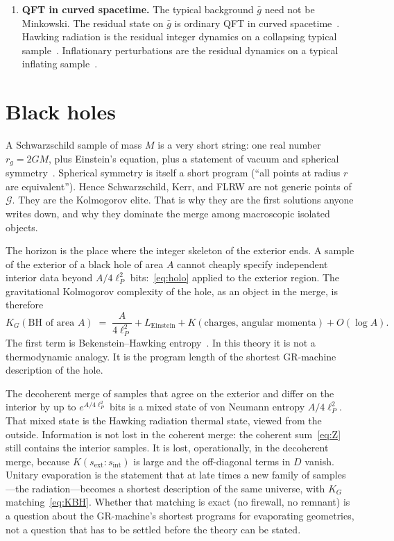 \documentclass[11pt,a4paper]{article}
\theoremstyle{plain}
\theoremstyle{definition}
\theoremstyle{remark}
\newcommand{\Geo}{\mathcal{G}}
\newcommand{\KG}{K_{G}}
\begin{document}
\begin{enumerate}
  \item \textbf{QFT in curved spacetime.}
  The typical background $\bar{g}$ need not be Minkowski.
  The residual state on $\bar{g}$ is ordinary QFT in curved spacetime~\cite{birrell1982,wald1994}.
  Hawking radiation is the residual integer dynamics on a collapsing typical sample~\cite{hawking1975}.
  Inflationary perturbations are the residual dynamics on a typical inflating sample~\cite{mukhanov1992}.
\end{enumerate}

\section{Black holes}
\label{sec:bh}

A Schwarzschild sample of mass $M$ is a very short string: one real number $r_{g}=2GM$, plus Einstein's equation, plus a statement of vacuum and spherical symmetry~\cite{dzhunushaliev1998}.
Spherical symmetry is itself a short program (``all points at radius $r$ are equivalent'').
Hence Schwarzschild, Kerr, and FLRW are not generic points of $\Geo$.
They are the Kolmogorov elite.
That is why they are the first solutions anyone writes down, and why they dominate the merge among macroscopic isolated objects.

The horizon is the place where the integer skeleton of the exterior ends.
A sample of the exterior of a black hole of area $A$ cannot cheaply specify independent interior data beyond $A/4\ell_{P}^{2}$ bits:~\eqref{eq:holo} applied to the exterior region.
The gravitational Kolmogorov complexity of the hole, as an object in the merge, is therefore
\begin{equation}
  \KG(\text{BH of area }A) \;=\; \frac{A}{4\ell_{P}^{2}} + L_{\mathrm{Einstein}} + K(\text{charges, angular momenta}) + O(\log A).
  \label{eq:KBH}
\end{equation}
The first term is Bekenstein--Hawking entropy~\cite{bekenstein1973,hawking1975,gibbons1977}.
In this theory it is not a thermodynamic analogy.
It is the program length of the shortest GR-machine description of the hole.

The decoherent merge of samples that agree on the exterior and differ on the interior by up to $e^{A/4\ell_{P}^{2}}$ bits is a mixed state of von Neumann entropy $A/4\ell_{P}^{2}$.
That mixed state is the Hawking radiation thermal state, viewed from the outside.
Information is not lost in the coherent merge: the coherent sum~\eqref{eq:Z} still contains the interior samples.
It is lost, operationally, in the decoherent merge, because $K(s_{\mathrm{ext}}:s_{\mathrm{int}})$ is large and the off-diagonal terms in $D$ vanish.
Unitary evaporation is the statement that at late times a new family of samples---the radiation---becomes a shortest description of the same universe, with $\KG$ matching~\eqref{eq:KBH}.
Whether that matching is exact (no firewall, no remnant) is a question about the GR-machine's shortest programs for evaporating geometries, not a question that has to be settled before the theory can be stated.
\end{document}
